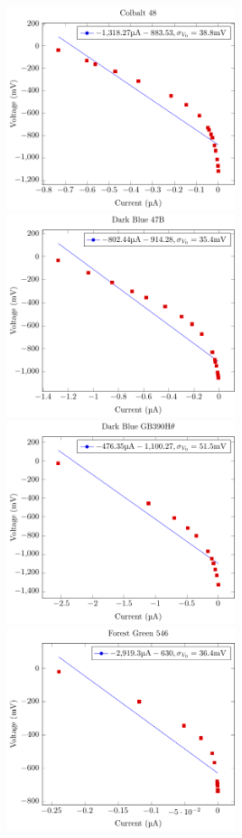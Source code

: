 \documentclass[a4paper]{article}
\begin{document}
\includegraphics[width=0.5\textwidth]{P1-PlanksConstant/Plots/Colbalt48/colbalt48.pdf}
\includegraphics[width=0.5\textwidth]{P1-PlanksConstant/Plots/DarkBlue47B/darkBlue47B.pdf}
\includegraphics[width=0.5\textwidth]{P1-PlanksConstant/Plots/DarkBlueGB390HTheta/darkBlueGB390HTheta.pdf}
\includegraphics[width=0.5\textwidth]{P1-PlanksConstant/Plots/ForestGreen546/forestGreen546.pdf}
\end{document}
